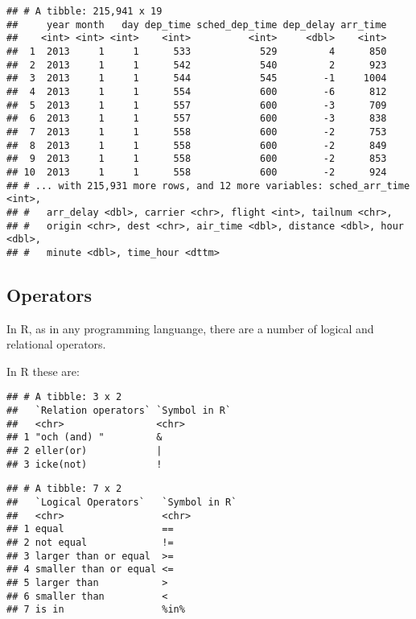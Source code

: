 \documentclass[]{book}
\begin{document}
\begin{verbatim}
## # A tibble: 215,941 x 19
##     year month   day dep_time sched_dep_time dep_delay arr_time
##    <int> <int> <int>    <int>          <int>     <dbl>    <int>
##  1  2013     1     1      533            529         4      850
##  2  2013     1     1      542            540         2      923
##  3  2013     1     1      544            545        -1     1004
##  4  2013     1     1      554            600        -6      812
##  5  2013     1     1      557            600        -3      709
##  6  2013     1     1      557            600        -3      838
##  7  2013     1     1      558            600        -2      753
##  8  2013     1     1      558            600        -2      849
##  9  2013     1     1      558            600        -2      853
## 10  2013     1     1      558            600        -2      924
## # ... with 215,931 more rows, and 12 more variables: sched_arr_time <int>,
## #   arr_delay <dbl>, carrier <chr>, flight <int>, tailnum <chr>,
## #   origin <chr>, dest <chr>, air_time <dbl>, distance <dbl>, hour <dbl>,
## #   minute <dbl>, time_hour <dttm>
\end{verbatim}

\hypertarget{operators}{%
\subsection{Operators}\label{operators}}

In R, as in any programming languange, there are a number of logical and relational operators.

In R these are:

\begin{verbatim}
## # A tibble: 3 x 2
##   `Relation operators` `Symbol in R`
##   <chr>                <chr>        
## 1 "och (and) "         &            
## 2 eller(or)            |            
## 3 icke(not)            !
\end{verbatim}

\begin{verbatim}
## # A tibble: 7 x 2
##   `Logical Operators`   `Symbol in R`
##   <chr>                 <chr>        
## 1 equal                 ==           
## 2 not equal             !=           
## 3 larger than or equal  >=           
## 4 smaller than or equal <=           
## 5 larger than           >            
## 6 smaller than          <            
## 7 is in                 %in%
\end{verbatim}
\end{document}
